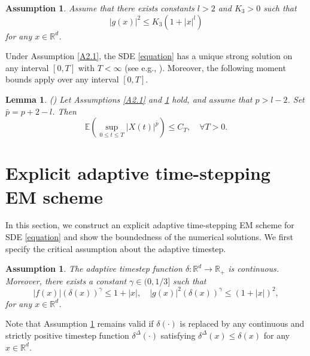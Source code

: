 \documentclass[preprint,12pt,compress]{elsarticle}
\newtheorem{lemma}[theorem]{Lemma}%
\newtheorem{assumption}[theorem]{Assumption}
\begin{document}
\begin{assumption}  \label{Ag}
	Assume that there exists constants $l > 2$ and $K_3 > 0$ such that
	\begin{equation*}
		{\left| {g(x)} \right|^2} \le K_3\left( {1 + {{\left| x \right|}^{l}}} \right) 
	\end{equation*}
	 for any $x \in \mathbb{R}^d$.
\end{assumption}

Under Assumption \ref{A2.1}, the SDE \eqref{equation} has a unique strong solution on any interval $[0, T]$ with $T < \infty$ (see e.g., \cite{mao2008stochastic}). Moreover, the following moment bounds apply over any interval $[0, T]$. 

\begin{lemma} (\cite[Lemma 4.2]{mao2015the})  \label{EXt}
Let Assumptions \ref{A2.1} and \ref{Ag} hold, and assume that $ p > l-2$. Set $\bar p = p +2-l$. Then
\begin{equation*}
	\mathbb{E}\left( {\mathop {\sup }\limits_{0 \le t \le T} {{\left| {X(t)} \right|}^{\bar p}}} \right) \le C_T, \quad \forall T > 0.
\end{equation*}
\end{lemma}


\section{Explicit adaptive time-stepping EM scheme} \label{sec3}

In this section, we construct an explicit adaptive time-stepping EM scheme for SDE \eqref{equation} and show the boundedness of the numerical solutions.
We first specify the critical assumption about the adaptive timestep.

\begin{assumption}  \label{A-stepsize}
	The adaptive timestep function $\delta :{\mathbb{R}^d} \to \mathbb{R}_+$ is continuous. Moreover, there exists a constant $\gamma \in (0,1/3]$ such that 
	\begin{equation}  \label{A-step1}
		\left| {f(x)} \right|{\left( {\delta (x)} \right)^\gamma } \le {1 + \left| x \right|} , \quad {\left| {g(x)} \right|^2}{\left( {\delta (x)} \right)^\gamma } \le  {\left( {1 + \left| x \right|} \right)^2} ,
	\end{equation}	
	for any $x \in \mathbb{R}^d$.
\end{assumption}

Note that Assumption \ref{A-stepsize} remains valid if $\delta (\cdot)$ is replaced by any continuous and strictly positive timestep function $\delta^\Delta (\cdot)$ satisfying $\delta^\Delta (x) \le \delta(x)$ for any $x \in \mathbb{R}^d$.
\end{document}
